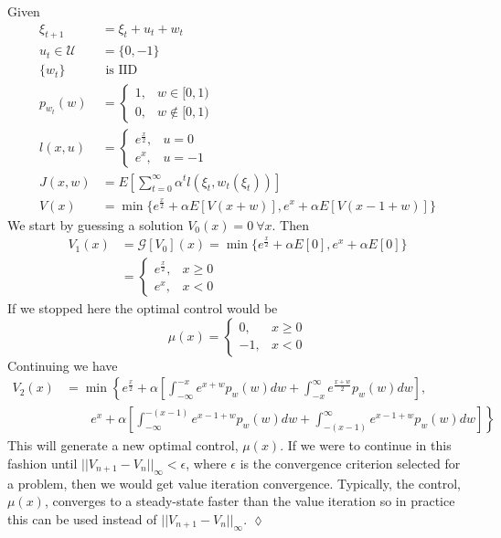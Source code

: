 \begin{example}
Given
\begin{align*}
\xi_{t+1} &= \xi_t+u_t+w_t \\
u_t\in\mathcal{U} &= \{0,-1\} \\
\{w_t\} &\text{~is~IID} \\
p_{w_t}(w) &= \begin{cases} 1, & w\in[0,1) \\ 0, & w\notin[0,1) \end{cases} \\%
l(x,u) &= \begin{cases} e^{\frac{x}{2}}, & u=0 \\ e^x, & u=-1 \end{cases} \\
J(x,w) &= E\left[\sum_{t=0}^\infty \alpha^t l(\xi_t,w_t(\xi_t))\right] \\
V(x) &= \min\{e^{\frac{x}{2}} + \alpha E[V(x+w)], e^x + \alpha E[V(x-1+w)]\}
\end{align*}
We start by guessing a solution $V_0(x)=0~\forall x$.
Then
\begin{align*}
V_1(x) &= \mathcal{G}[V_0](x) = \min\{e^{\frac{x}{2}}+\alpha E[0], e^x + \alpha E[0]\} \\
&= \begin{cases} e^{\frac{x}{2}}, & x\geq0 \\ e^x, & x<0 \end{cases}
\end{align*}
If we stopped here the optimal control would be
$$\mu(x) = \begin{cases} 0, & x\geq0 \\ -1, & x<0 \end{cases}$$
Continuing we have
\begin{align*}
V_2(x) &= \min\left\lbrace e^{\frac{x}{2}} + \alpha\left[\int_{-\infty}^{-x} e^{x+w}p_w(w)dw + \int_{-x}^\infty e^{\frac{x+w}{2}}p_w(w)dw\right], \right. \\
&\left.\qquad e^x+\alpha\left[\int_{-\infty}^{-(x-1)}e^{x-1+w}p_w(w)dw + \int_{-(x-1)}^\infty e^{x-1+w}p_w(w)dw\right]\right\rbrace
\end{align*}
This will generate a new optimal control, $\mu(x)$.
If we were to continue in this fashion until $||V_{n+1}-V_n||_\infty<\epsilon$, where $\epsilon$ is the convergence criterion selected for a problem, then we would get value iteration convergence.
Typically, the control, $\mu(x)$, converges to a steady-state faster than the value iteration so in practice this can be used instead of $||V_{n+1}-V_n||_\infty$.
$\lozenge$
\end{example}

